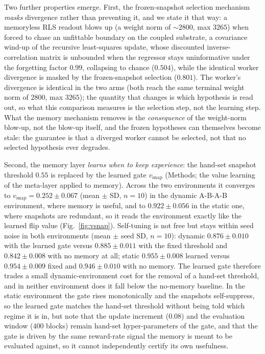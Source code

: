 \documentclass[preprint,12pt]{elsarticle}
\begin{document}
Two further properties emerge. First, the frozen-snapshot selection
mechanism \emph{masks} divergence rather than preventing it, and we state it
that way: a memoryless RLS readout
blows up (a weight norm of $\sim2800$, max $3265$) when forced to chase an
unfittable boundary on the coupled substrate, a covariance wind-up of the
recursive least-squares update, whose discounted inverse-correlation matrix
is unbounded when the regressor stays uninformative under the forgetting
factor $0.99$, collapsing to chance ($0.504$), while
the identical worker divergence is masked by the frozen-snapshot selection
($0.801$). The worker's divergence is identical in the two arms (both reach
the same terminal weight norm of $2800$, max $3265$); the
quantity that changes is which hypothesis is read out, so what this
comparison measures is the selection step, not the learning step. What the memory
mechanism removes is the \emph{consequence} of the weight-norm blow-up, not
the blow-up itself, and the frozen hypotheses can themselves become stale:
the guarantee is that a diverged worker cannot be selected, not that no
selected hypothesis ever degrades.

Second, the memory layer \emph{learns when
to keep experience}:
the hand-set snapshot threshold $0.55$ is replaced by the learned gate
$v_{\mathrm{snap}}$ (Methods; the value learning of the meta-layer applied to
memory). Across the two environments it converges to
$v_{\mathrm{snap}}=0.252\pm0.067$ (mean $\pm$ SD, $n=10$) in the dynamic
A-B-A-B environment, where memory is useful, and to $0.922\pm0.056$ in the
static one, where snapshots are redundant, so it reads the environment
exactly like the learned flip value (Fig.~\ref{fig:vsnap}). Self-tuning is
not free but stays within seed noise in both environments (mean $\pm$ seed
SD, $n=10$): dynamic $0.876\pm0.010$ with the learned gate versus
$0.885\pm0.011$ with the fixed threshold and $0.842\pm0.008$ with no memory
at all; static $0.955\pm0.008$ learned versus $0.954\pm0.009$ fixed and
$0.946\pm0.010$ with no memory. The learned gate therefore trades a small
dynamic-environment cost for the removal of a hand-set threshold, and in
neither environment does it fall below the no-memory baseline. In the static
environment the gate rises monotonically and the
snapshots self-suppress, so the learned gate matches the hand-set threshold
without being told which regime it is in, but note that the update
increment ($0.08$) and the evaluation window ($400$ blocks) remain hand-set
hyper-parameters of the gate, and that the gate is driven by the same
reward-rate signal the memory is meant to be evaluated against, so it cannot
independently certify its own usefulness.
\end{document}
